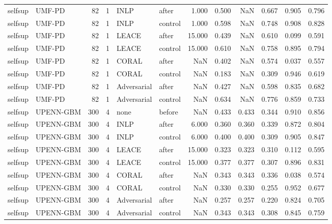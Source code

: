 \begin{tabular}{llrrllrrrrrr}
selfsup & UMF-PD & 82 & 1 & INLP & after & 1.000 & 0.500 & NaN & 0.667 & 0.905 & 0.796 \\
selfsup & UMF-PD & 82 & 1 & INLP & control & 1.000 & 0.598 & NaN & 0.748 & 0.908 & 0.828 \\
selfsup & UMF-PD & 82 & 1 & LEACE & after & 15.000 & 0.439 & NaN & 0.610 & 0.099 & 0.591 \\
selfsup & UMF-PD & 82 & 1 & LEACE & control & 15.000 & 0.610 & NaN & 0.758 & 0.895 & 0.794 \\
selfsup & UMF-PD & 82 & 1 & CORAL & after & NaN & 0.402 & NaN & 0.574 & 0.037 & 0.557 \\
selfsup & UMF-PD & 82 & 1 & CORAL & control & NaN & 0.183 & NaN & 0.309 & 0.946 & 0.619 \\
selfsup & UMF-PD & 82 & 1 & Adversarial & after & NaN & 0.427 & NaN & 0.598 & 0.835 & 0.682 \\
selfsup & UMF-PD & 82 & 1 & Adversarial & control & NaN & 0.634 & NaN & 0.776 & 0.859 & 0.733 \\
selfsup & UPENN-GBM & 300 & 4 & none & before & NaN & 0.433 & 0.433 & 0.344 & 0.910 & 0.856 \\
selfsup & UPENN-GBM & 300 & 4 & INLP & after & 6.000 & 0.360 & 0.360 & 0.339 & 0.872 & 0.804 \\
selfsup & UPENN-GBM & 300 & 4 & INLP & control & 6.000 & 0.400 & 0.400 & 0.309 & 0.905 & 0.847 \\
selfsup & UPENN-GBM & 300 & 4 & LEACE & after & 15.000 & 0.323 & 0.323 & 0.310 & 0.112 & 0.595 \\
selfsup & UPENN-GBM & 300 & 4 & LEACE & control & 15.000 & 0.377 & 0.377 & 0.307 & 0.896 & 0.831 \\
selfsup & UPENN-GBM & 300 & 4 & CORAL & after & NaN & 0.343 & 0.343 & 0.336 & 0.038 & 0.574 \\
selfsup & UPENN-GBM & 300 & 4 & CORAL & control & NaN & 0.330 & 0.330 & 0.255 & 0.952 & 0.677 \\
selfsup & UPENN-GBM & 300 & 4 & Adversarial & after & NaN & 0.257 & 0.257 & 0.220 & 0.824 & 0.705 \\
selfsup & UPENN-GBM & 300 & 4 & Adversarial & control & NaN & 0.343 & 0.343 & 0.308 & 0.845 & 0.759 \\
\bottomrule
\end{tabular}
